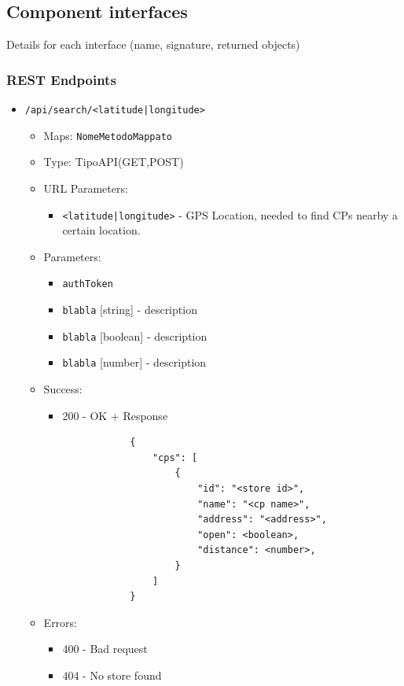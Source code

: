 \subsection{Component interfaces}
Details for each interface (name, signature, returned objects)
\subsubsection{REST Endpoints}
\renewcommand{\labelitemii}{}
\renewcommand{\labelitemiii}{-}
\begin{itemize}
    \item \texttt{/api/search/<latitude|longitude>}
          \begin{itemize}
              \item Maps: \texttt{NomeMetodoMappato}
              \item Type: TipoAPI(GET,POST)
              \item URL Parameters:
                    \begin{itemize}
                        \item \texttt{<latitude|longitude>} - GPS Location, needed to find CPs nearby a certain location.
                    \end{itemize}
              \item Parameters:
                    \begin{itemize}
                        \item \texttt{authToken}
                        \item \texttt{blabla} [string] - description
                        \item \texttt{blabla} [boolean] - description
                        \item \texttt{blabla} [number] - description
                    \end{itemize}
              \item Success:
                    \begin{itemize}
                        \item 200 - OK + Response
                              \begin{lstlisting}
            {
                "cps": [
                    {
                        "id": "<store id>",
                        "name": "<cp name>",
                        "address": "<address>",
                        "open": <boolean>,
                        "distance": <number>,
                    }
                ]
            }
            \end{lstlisting}
                    \end{itemize}
              \item Errors:
                    \begin{itemize}
                        \item 400 - Bad request
                        \item 404 - No store found
                    \end{itemize}
          \end{itemize}
\end{itemize}

